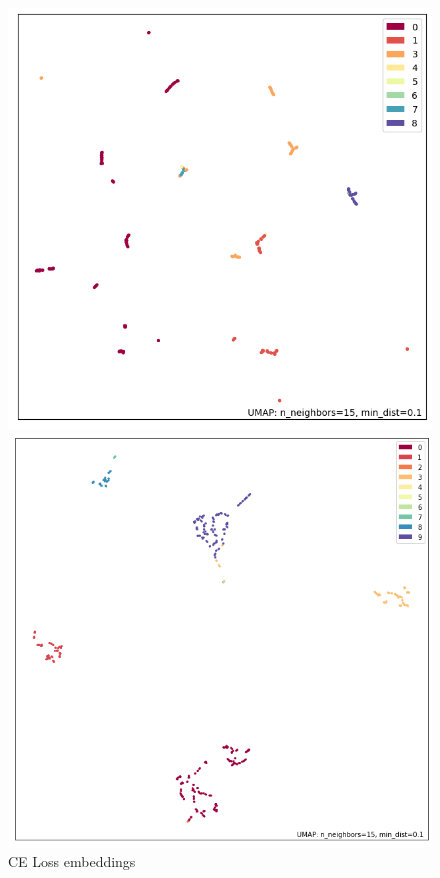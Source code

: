 \documentclass{article}
\begin{document}
    \begin{figure}[H]
        \begin{minipage}[b]{0.33\linewidth}
            \centering
            \includegraphics[width=\textwidth]{../results/baseline_umap.png}
            \caption{CE Loss embeddings}
            \label{fig:figure 1.1}
        \end{minipage}
        \begin{minipage}[b]{0.33\linewidth}
            \centering
            \includegraphics[width=\textwidth]{../results/supcon_256.png}

\end{minipage}
\end{figure}
\end{document}
